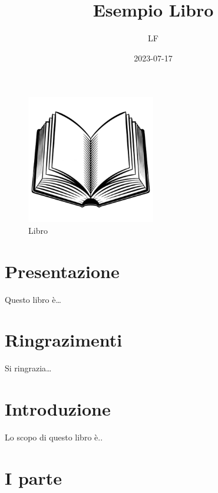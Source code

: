 \documentclass[
]{book}
\title{Esempio Libro}
\author{LF}
\date{2023-07-17}
\begin{document}
\maketitle

{
\setcounter{tocdepth}{1}
\tableofcontents
}
\begin{figure}
\centering
\includegraphics[width=0.5\textwidth,height=\textheight]{images/logo.png}
\caption{Libro}
\end{figure}

\hypertarget{presentazione}{%
\chapter*{Presentazione}\label{presentazione}}

Questo libro è\ldots{}

\hypertarget{ringrazimenti}{%
\chapter*{Ringrazimenti}\label{ringrazimenti}}

Si ringrazia\ldots{}

\hypertarget{introduzione}{%
\chapter*{Introduzione}\label{introduzione}}

Lo scopo di questo libro è..

\hypertarget{i-parte}{%
\chapter*{I parte}\label{i-parte}}
\end{document}
